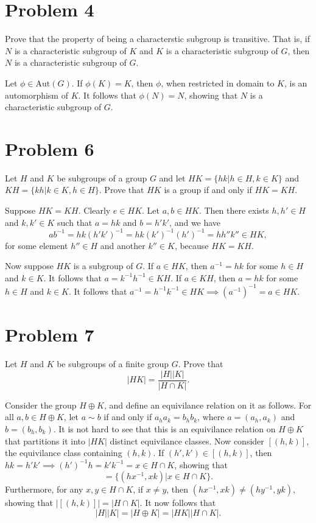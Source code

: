 \documentclass[12pt]{article}
\newcommand{\aut}{\mbox{Aut}}
\begin{document}
\section*{Problem 4}

Prove that the property of being a characterstic subgroup is transitive.
That is, if $N$ is a characteristic subgroup of $K$ and $K$ is a characteristic
subgroup of $G$, then $N$ is a characteristic subgroup of $G$.

Let $\phi\in\aut(G)$.  If $\phi(K)=K$, then $\phi$, when restricted in
domain to $K$, is an automorphism of $K$.  It follows that
$\phi(N)=N$, showing that $N$ is a characteristic subgroup of $G$.

\section*{Problem 6}

Let $H$ and $K$ be subgroups of a group $G$ and let $HK=\{hk|h\in H,k\in K\}$
and $KH=\{kh|k\in K,h\in H\}$.  Prove that $HK$ is a group if and only if
$HK=KH$.

Suppose $HK=KH$.  Clearly $e\in HK$.  Let $a,b\in HK$.
Then there exists $h,h'\in H$ and $k,k'\in K$ such that
$a=hk$ and $b=h'k'$, and we have
\begin{equation*}
ab^{-1}=hk(h'k')^{-1}=hk(k')^{-1}(h')^{-1} = hh''k''\in HK,
\end{equation*}
for some element $h''\in H$ and another $k''\in K$, because
$HK=KH$.

Now suppose $HK$ is a subgroup of $G$.  If $a\in HK$,
then $a^{-1}=hk$ for some $h\in H$ and $k\in K$.
It follows that $a=k^{-1}h^{-1}\in KH$.
If $a\in KH$, then $a=hk$ for some $h\in H$ and $k\in K$.
It follows that $a^{-1}=h^{-1}k^{-1}\in HK\implies (a^{-1})^{-1}=a\in HK$.

\pagebreak
\section*{Problem 7}

Let $H$ and $K$ be subgroups of a finite group $G$.  Prove that
\begin{equation*}
|HK|=\frac{|H||K|}{|H\cap K|}.
\end{equation*}

Consider the group $H\oplus K$, and define an equivilance
relation on it as follows.  For all $a,b\in H\oplus K$,
let $a\sim b$ if and only if $a_ha_k=b_hb_k$,
where $a=(a_h,a_k)$ and $b=(b_h,b_k)$.  It is not
hard to see that this is an equivilance relation
on $H\oplus K$ that partitions it into $|HK|$
distinct equivilance classes.  Now consider
$[(h,k)]$, the equivilance class containing $(h,k)$.
If $(h',k')\in[(h,k)]$, then $hk=h'k'\implies (h')^{-1}h=k'k^{-1}=x\in H\cap K$,
showing that
\begin{equation*}
[(h,k)]=\{(hx^{-1},xk)|x\in H\cap K\}.
\end{equation*}
Furthermore, for any $x,y\in H\cap K$, if $x\neq y$, then
$(hx^{-1},xk)\neq (hy^{-1},yk)$, showing that
$|[(h,k)]|=|H\cap K|$.  It now follows that
\begin{equation*}
|H||K|=|H\oplus K|=|HK||H\cap K|.
\end{equation*}
\end{document}
